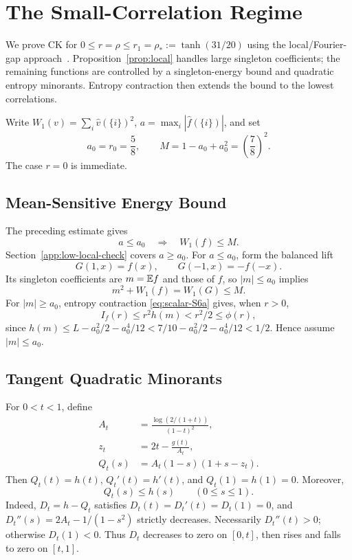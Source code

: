 \section{The Small-Correlation Regime}
\label{app:low}

We prove CK for \(0\le r=\rho\le r_1=\rho_*:=\tanh(31/20)\)
using the local/Fourier-gap approach~\cite{Sam,YuPhi,Yu}.
Proposition~\ref{prop:local} handles large singleton coefficients;
the remaining functions are controlled by a singleton-energy bound
and quadratic entropy minorants.
Entropy contraction then extends the bound to the lowest correlations.

Write \(W_1(v)=\sum_i\widehat v(\{i\})^2\),
\(a=\max_i|\widehat f(\{i\})|\), and set
\[
 a_0=r_0=\frac58,\qquad
 M=1-a_0+a_0^2=\left(\frac78\right)^2.
\]
The case \(r=0\) is immediate.



\subsection{Mean-Sensitive Energy Bound}

The preceding estimate gives
\begin{equation}
 a\le a_0\quad\Longrightarrow\quad W_1(f)\le M.
 \label{eq:fourier-cap}
\end{equation}
Section~\ref{app:low-local-check} covers \(a\ge a_0\).
For \(a\le a_0\), form the balanced lift
\[
 G(1,x)=f(x),\qquad G(-1,x)=-f(-x).
\]
Its singleton coefficients are \(m=\mathbb E f\) and those of \(f\), so
\(|m|\le a_0\) implies
\begin{equation}
                         m^2+W_1(f)=W_1(G)\le M.
 \label{eq:lift}
\end{equation}
For \(|m|\ge a_0\), entropy contraction
\eqref{eq:scalar-S6a} gives, when \(r>0\),
\[
 I_f(r)\le r^2h(m)<r^2/2\le\phi(r),
\]
since \(h(m)\le L-a_0^2/2-a_0^4/12
<7/10-a_0^2/2-a_0^4/12<1/2\). Hence assume \(|m|\le a_0\).

\subsection{Tangent Quadratic Minorants}

For \(0<t<1\), define
\begin{align*}
 A_t&=\frac{\log(2/(1+t))}{(1-t)^2},\\
 z_t&=2t-\frac{g(t)}{A_t},\\
 Q_t(s)&=A_t(1-s)(1+s-z_t).
\end{align*}
Then \(Q_t(t)=h(t)\), \(Q_t'(t)=h'(t)\), and \(Q_t(1)=h(1)=0\).
Moreover,
\begin{equation}
                         Q_t(s)\le h(s)\qquad(0\le s\le1).
 \label{eq:entropy-tangent-family}
\end{equation}
Indeed, \(D_t=h-Q_t\) satisfies \(D_t(t)=D_t'(t)=D_t(1)=0\),
and \(D_t''(s)=2A_t-1/(1-s^2)\) strictly decreases.
Necessarily \(D_t''(t)>0\); otherwise \(D_t(1)<0\).
Thus \(D_t\) decreases to zero on \([0,t]\), then rises and falls
to zero on \([t,1]\).


